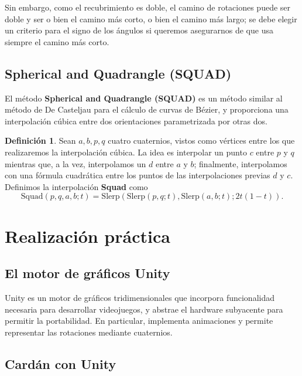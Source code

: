 \documentclass{article}
\theoremstyle{plain}
\theoremstyle{definition}
\newtheorem{definition}{Definición}
\theoremstyle{remark}
\begin{document}
Sin embargo, como el recubrimiento es doble, el camino de rotaciones
puede ser doble y ser o bien el camino más corto, o bien el camino más
largo; se debe elegir un criterio para el signo de los ángulos si
queremos asegurarnos de que usa siempre el camino más corto.


\subsection{Spherical and Quadrangle (SQUAD)}

El método \textbf{Spherical and Quadrangle (SQUAD)} es un método
similar al método de De Casteljau para el cálculo de curvas de Bézier,
y proporciona una interpolación cúbica entre dos orientaciones
parametrizada por otras dos.

\begin{definition}
Sean $a,b,p,q$ cuatro cuaternios, vistos como vértices entre los que
realizaremos la interpolación cúbica. La idea es interpolar un punto
$c$ entre $p$ y $q$ mientras que, a la vez, interpolamos un $d$ entre
$a$ y $b$; finalmente, interpolamos con una fórmula cuadrática entre
los puntos de las interpolaciones previas $d$ y $c$. Definimos la
interpolación \textbf{Squad} como
\[
  \mathrm{Squad}(p,q,a,b;t) =
  \mathrm{Slerp}(\mathrm{Slerp}(p,q;t), \mathrm{Slerp}(a,b;t); 2t(1-t)).
\]
\end{definition}

\section{Realización práctica}

\subsection{El motor de gráficos Unity}

Unity \cite{unity} es un motor de gráficos tridimensionales que incorpora funcionalidad necesaria para desarrollar videojuegos, y abstrae el hardware subyacente para permitir la portabilidad. En particular, implementa animaciones y permite representar las rotaciones mediante cuaternios.

\subsection{Cardán con Unity}
\end{document}

